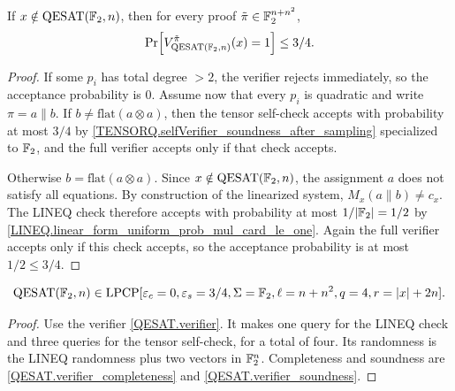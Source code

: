 \begin{lemma}[Soundness]
\label{QESAT.verifier_soundness}
\leanok
If \(x\notin \mathrm{QESAT}(\mathbb{F}_2,n)\), then for every proof
\(\tilde\pi\in\mathbb{F}_2^{n+n^2}\),
\[\Pr\!\left[V_{\mathrm{QESAT}(\mathbb{F}_2,n)}^{\tilde\pi}(x)=1\right]\leq 3 / 4.\]
\end{lemma}
\begin{proof}\leanok
If some \(p_i\) has total degree \(>2\), the verifier rejects immediately, so
the acceptance probability is \(0\). Assume now that every \(p_i\) is quadratic
and write \(\pi=a\parallel b\). If \(b\neq\mathrm{flat}(a\otimes a)\), then
the tensor self-check accepts with probability at most \(3/4\) by
\ref{TENSORQ.selfVerifier_soundness_after_sampling} specialized to \(\mathbb{F}_2\), and
the full verifier accepts only if that check accepts.

Otherwise \(b=\mathrm{flat}(a\otimes a)\). Since \(x\notin\mathrm{QESAT}(\mathbb{F}_2,n)\),
the assignment \(a\) does not satisfy all equations. By construction of the
linearized system, \(M_x(a\parallel b)\neq c_x\). The LINEQ check
therefore accepts with probability at most \(1/|\mathbb{F}_2|=1/2\) by
\ref{LINEQ.linear_form_uniform_prob_mul_card_le_one}. Again the full verifier
accepts only if this check accepts, so the acceptance probability is at most
\(1/2\leq 3/4\).
\end{proof}

\begin{theorem}
\label{QESAT_poly_LPCP}
\leanok
\[
  \mathrm{QESAT}(\mathbb{F}_2,n) \in
  \mathrm{LPCP}[
    \varepsilon_c = 0,
    \varepsilon_s = 3/4,
    \Sigma = \mathbb{F}_2,
    \ell = n + n^2,
    q = 4,
    r = |x| + 2n
  ].
\]
\end{theorem}
\begin{proof}\leanok
Use the verifier \ref{QESAT.verifier}. It makes one query for the LINEQ check
and three queries for the tensor self-check, for a total of four. Its
randomness is the LINEQ randomness plus two vectors in \(\mathbb{F}_2^n\). Completeness
and soundness are \ref{QESAT.verifier_completeness} and
\ref{QESAT.verifier_soundness}.
\end{proof}

